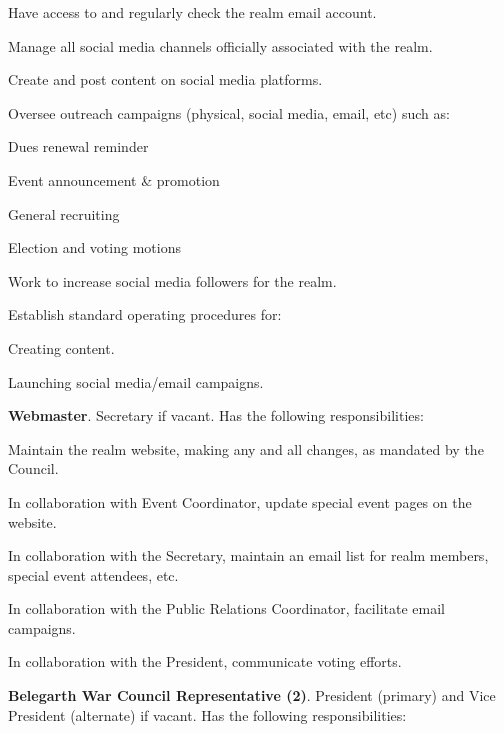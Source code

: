 \documentclass[12pt]{article}
\begin{document}
\begin{level}
\begin{level}
\begin{level}
        \item Have access to and regularly check the realm email account.
        \item Manage all social media channels officially associated with the realm.
        \item Create and post content on social media platforms.
        \item Oversee outreach campaigns (physical, social media, email, etc) such as:
        \begin{level}
            \item Dues renewal reminder
            \item Event announcement \& promotion
            \item General recruiting
            \item Election and voting motions
        \end{level}
        \item Work to increase social media followers for the realm.
        \item Establish standard operating procedures for:
        \begin{level}
            \item Creating content.
            \item Launching social media/email campaigns.
        \end{level}
    \end{level}
    \item \textbf{Webmaster}. Secretary if vacant. Has the following responsibilities:
    \begin{level}
        \item Maintain the realm website, making any and all changes, as mandated by the Council.
        \item In collaboration with Event Coordinator, update special event pages on the website.
        \item In collaboration with the Secretary, maintain an email list for realm members, special event attendees, etc.
        \item In collaboration with the Public Relations Coordinator, facilitate email campaigns.
        \item In collaboration with the President, communicate voting efforts.
    \end{level}
    \item \textbf{Belegarth War Council Representative (2)}. President (primary) and Vice President (alternate) if vacant. Has the following responsibilities:

\end{level}
\end{level}
\end{document}
